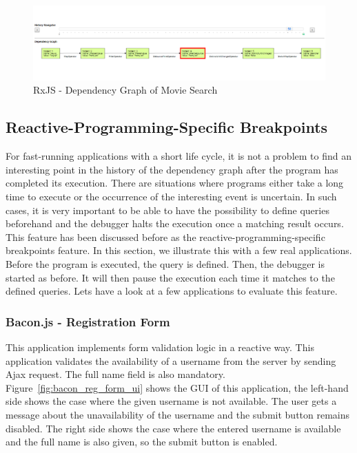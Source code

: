 \begin{figure}[!h]
	\centering
	\includegraphics[width=\textwidth,height=\textheight,keepaspectratio]{gfx/evaluation/rxjs_movie_search_history.png}
	\caption{RxJS - Dependency Graph of Movie Search}
	\label{fig:rxjs_movie_search_dg}
\end{figure}




\subsection{Reactive-Programming-Specific Breakpoints}

For fast-running applications with a short life cycle, it is not a problem to find an interesting point in the history of the dependency graph after the program has completed its execution. There are situations where programs either take a 
long time to execute or the occurrence of the interesting event is uncertain. In such cases, it is very important to be able to have the possibility to define queries beforehand and the debugger halts the execution once a matching result occurs. 
This feature has been discussed before as the reactive-programming-specific breakpoints feature. In this section, we illustrate this with a few real applications. Before the program is executed, the query is defined. Then, the debugger is started as before. It will then pause the execution each time it matches to the defined queries. Let\textquotesingle s have a look at a few applications to evaluate this feature.

\subsubsection{Bacon.js - Registration Form}

This application implements form validation logic in a reactive way. This application validates the availability of a username from the server by sending Ajax request. The full name field is also mandatory. 
Figure~\ref{fig:bacon_reg_form_ui} shows the GUI of this application, the left-hand side shows the case where the given username is not available.  The user gets a message about the unavailability of the username and the submit button remains disabled. The right side shows the case where the entered username is available and the full name is also given, so the submit button is enabled. 

